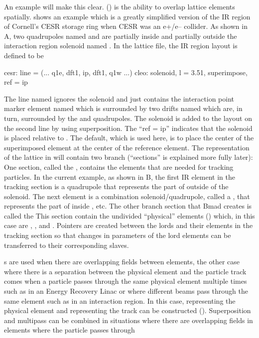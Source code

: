 An example will make this clear.
 () is the ability to overlap lattice
elements spatially.  shows an example which is a
greatly simplified version of the IR region of Cornell's CESR storage
ring when CESR was an e+/e-- collider. As shown in A,
two quadrupoles named  and  are partially inside and
partially outside the interaction region solenoid named . In
the lattice file, the IR region layout is defined to be
 {\small
\begin{example}
  cesr: line = (... q1e, dft1, ip, dft1, q1w ...)
  cleo: solenoid, l = 3.51, superimpose, ref = ip
\end{example}
 }
The line named  ignores the solenoid and just contains the
interaction point marker element named  which is surrounded by
two drifts named  which are, in turn, surrounded by the
 and  quadrupoles. The solenoid is added to the layout
on the second line by using superposition. The ``ref = ip'' indicates
that the solenoid is placed relative to . The default, which is
used here, is to place the center of the superimposed 
element at the center of the  reference element.  The
representation of the lattice in \bmad will contain two branch
 (``sections'' is explained more fully later): One
section, called the , contains the elements that
are needed for tracking particles. In the current example, as shown in
B, the first IR element in the tracking section is a
quadrupole that represents the part of  outside of the
solenoid. The next element is a combination solenoid/quadrupole,
called a , that represents the part of  inside
, etc.  The other branch section that Bmad creates is called
the  This section contain the undivided ``physical''
 elements () which, in this case are
, , and . Pointers are created between the
lords and their  elements in the tracking section so
that changes in parameters of the lord elements can be transferred to
their corresponding slaves.

s are used when there are overlapping fields between
elements, the other case where there is a separation between the
physical element and the particle track comes when a particle passes
through the same physical element multiple times such as in an Energy
Recovery Linac or where different beams pass through the same element
such as in an interaction region. In this case, 
representing the physical element and 
representing the track can be constructed ().
Superposition and multipass can be combined in situations where there
are overlapping fields in elements where the particle passes through

